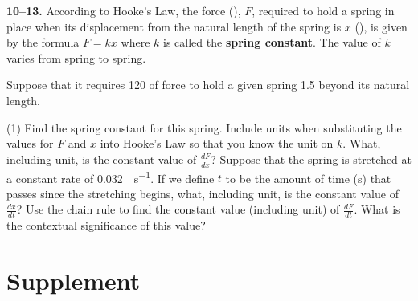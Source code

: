 \documentclass[10pt,oneside,]{book}
\newcommand{\terminology}[1]{\textbf{#1}}
\theoremstyle{plain}
\theoremstyle{definition}
\numberwithin{equation}{section}
\newcommand{\lz}[2]{\frac{d#1}{d#2}}
\begin{document}
\par\smallskip\noindent
\textbf{10--13. }\hypertarget{exercisegroup-99}{\null}According to Hooke's Law, the force (\si{\pound}), \(F\), required to hold a spring in place when its displacement from the natural length of the spring is \(x\) (\si{\foot}), is given by the formula \(F=kx\) where \(k\) is called the \terminology{spring constant}.  The value of \(k\) varies from spring to spring.%
\par
Suppose that it requires \SI{120}{\pound} of force to hold a given spring \SI{1.5}{\foot} beyond its natural length.%
\par
\begin{exercisegroup}(1)
\exercise[10.]\hypertarget{exercise-479}{\null}Find the spring constant for this spring. Include units when substituting the values for \(F\) and \(x\) into Hooke's Law so that you know the unit on \(k\).%
\exercise[11.]\hypertarget{exercise-480}{\null}What, including unit, is the constant value of \(\lz{F}{x}\)?%
\exercise[12.]\hypertarget{exercise-481}{\null}Suppose that the spring is stretched at a constant rate of \SI{0.032}{\foot\per\second}.  If we define \(t\) to be the amount of time (\si{\second}) that passes since the stretching begins, what, including unit, is the constant value of \(\lz{x}{t}\)?%
\exercise[13.]\hypertarget{exercise-482}{\null}Use the chain rule to find the constant value (including unit) of \(\lz{F}{t}\).  What is the contextual significance of this value?%
\end{exercisegroup}
\par\smallskip\noindent
\typeout{************************************************}
\typeout{************************************************}
\section[Supplement]{Supplement}\label{chain-rule-supplementary-exercises}
\typeout{************************************************}
\typeout{************************************************}
\end{document}

